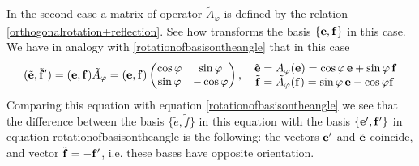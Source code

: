 \documentclass[12pt]{article}
\numberwithin{equation}{section}
\begin{document}
 In the second case a matrix of operator
$\tilde A_\varphi$ is defined by the relation 
\eqref{orthogonalrotation+reflection}.
See how transforms the basis $\{{\bf e},{\bf f}\}$ in this case.
  We have in analogy with \eqref{rotationofbasisontheangle}
that in this case
      \begin{equation}\label{rotationofbasisontheangle+rotation}
   (\tilde{{\bf e}},\tilde{{\bf f}}')=
   ({\bf e},{\bf f})
     \tilde A_\varphi=
     ({\bf e},{\bf f})
   \begin{pmatrix}
      \cos\varphi & \sin\varphi \\
      \sin\varphi & -\cos\varphi \\
    \end{pmatrix}
                 ,\quad
            \begin{matrix}
   \tilde{{\bf e}}=\tilde A_\varphi({\bf e})= \cos\varphi \,{\bf e}+\sin\varphi \,{\bf f}\cr
   \tilde{{\bf f}}=\tilde A_\varphi({\bf f})= \sin\varphi\, {\bf e}-\cos\varphi{\bf f}\,\cr
            \end{matrix}
            \end{equation}
Comparing this equation with equation \eqref{rotationofbasisontheangle}
we see that the difference between the  basis  $\{\tilde e,\tilde f\}$
in this equation with the basis $\{{\bf e}',{\bf f}'\}$ in equation
{rotationofbasisontheangle} is the following: the vectors ${\bf e}'$ and 
$\tilde {{\bf e}}$ coincide, and vector $\tilde {{\bf f}}=-{\bf f}'$, i.e. these bases
have opposite orientation.
\end{document}
